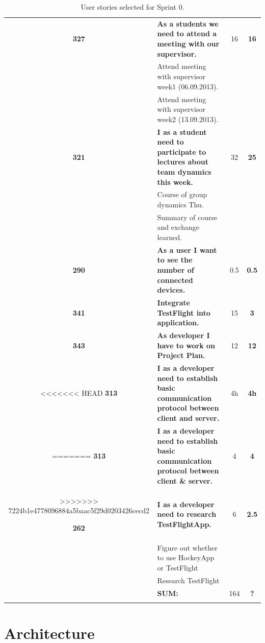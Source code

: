 \begin{longtable}{cp{8cm}cc}
\textbf{327} 	& {\bf As a students we need to attend a meeting with our supervisor. } 	& 		16	& \textbf{16} \\
				& Attend meeting with supervisor week1 (06.09.2013).	&  &  \\
				& Attend meeting with supervisor week2 (13.09.2013).	&  &  \\

\textbf{321} 	& {\bf I as a student need to participate to lectures about team dynamics this week. } 	& 		32	& \textbf{25} \\
				& Course of group dynamics Thu.	&  &  \\
				& Summary of course and exchange learned.	&  &  \\
				
\textbf{290} 	& {\bf As a user I want to see the number of connected devices. } 	& 		0.5	& \textbf{0.5} \\

\textbf{341} 	& {\bf Integrate TestFlight into application. } 	& 		15	& \textbf{3} \\

\textbf{343} 	& {\bf As developer I have to work on Project Plan.} 	& 		12	& \textbf{12} \\

<<<<<<< HEAD
\textbf{313} 	& {\bf I as a developer need to establish basic communication protocol between client and server.} 	& 		4h	& \textbf{4h} \\
=======
\textbf{313} 	& {\bf I as a developer need to establish basic communication protocol between client \& server.} 	& 		4	& \textbf{4} \\
>>>>>>> 7224b1e4778096884a5baac5f29d0203426cecd2

\textbf{262} 	& {\bf I as a developer need to research TestFlightApp. } 	& 		6	& \textbf{2.5} \\
				& Figure out whether to use HockeyApp or TestFlight&  &  \\
				& Research TestFlight	&  &  \\
				
\hline
				& \textbf{SUM:}		&		164	& \textbf{?}
 \\																			
\bottomrule[1mm]
\caption{User stories selected for Sprint 0. }
\label{tab:sprint0stories}
\end{longtable}


\section{Architecture}


